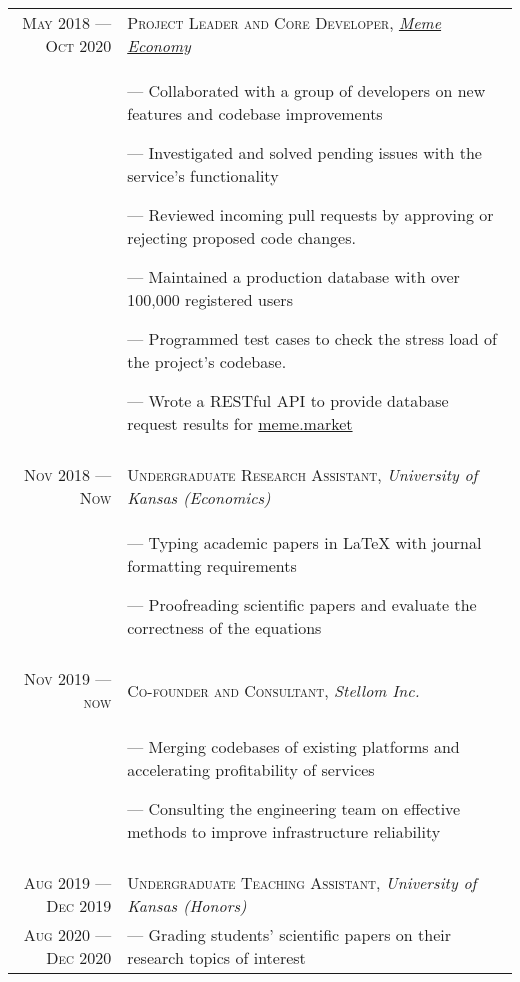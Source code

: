 \documentclass[a4paper, 10pt]{article}
\begin{document}
\begin{tabular}{r|p{12cm}}
	\textsc{May 2018 --- Oct 2020} & \textsc{Project Leader and Core Developer}, \emph{\href{https://meme.market}{Meme Economy}} \\&\footnotesize{
		--- Collaborated with a group of developers on new features and codebase improvements

		--- Investigated and solved pending issues with the service's functionality

		--- Reviewed incoming pull requests by approving or rejecting proposed code changes.

		--- Maintained a production database with over 100,000 registered users

		--- Programmed test cases to check the stress load of the project's codebase.

		--- Wrote a RESTful API to provide database request results for \href{https://meme.market}{meme.market}
	}                                                                                                                            \\\multicolumn{2}{c}{}\\

	\textsc{Nov 2018 --- Now}      & \textsc{Undergraduate Research Assistant}, \emph{University of Kansas (Economics)}          \\&\footnotesize{
		--- Typing academic papers in \LaTeX{} with journal formatting requirements

		--- Proofreading scientific papers and evaluate the correctness of the equations
	}                                                                                                                            \\\multicolumn{2}{c}{}\\

	\textsc{Nov 2019 --- now}      & \textsc{Co-founder and Consultant}, \emph{Stellom Inc.}                                     \\&\footnotesize{
		--- Merging codebases of existing platforms and accelerating profitability of services

		--- Consulting the engineering team on effective methods to improve infrastructure reliability
	}                                                                                                                            \\\multicolumn{2}{c}{}\\

	\textsc{Aug 2019 --- Dec 2019} & \textsc{Undergraduate Teaching Assistant}, \emph{University of Kansas (Honors)}             \\ \textsc{Aug 2020 --- Dec 2020} &\footnotesize{
		--- Grading students' scientific papers on their research topics of interest

}
\end{tabular}
\end{document}
